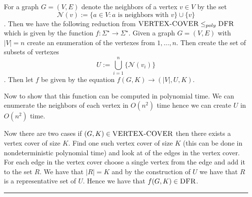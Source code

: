 \documentclass[11pt,twoside]{article}
\newcounter{problem}
\newcommand{\problembreak}{\bigskip\hrule\bigskip}
\begin{document}
For a graph $G=(V,E)$ denote the neighbors of a vertex $v\in V$ by the set $$\mathcal N(v):=\{a\in V: a\text{ is neighbors with }v\}\cup \{v\}$$. Then we have the following reduction from ${\normalfont{\textsc{VERTEX-COVER}}}\leq_{poly}{\normalfont{\textsc{DFR}}}$ which is given by the function $f:\Sigma^{\star}\to \Sigma^\star$. Given a graph $G=(V,E)$ with $|V|=n$ create an enumeration of the vertexes from $1,...,n$.  Then create the set of subsets of vertexes $$U:=\bigcup_{i=1}^n\{\mathcal{N}(v_i)\}$$. Then let $f$ be given by the equation $f(G,K)\to (|V|,U,K)$. 

Now to show that this function can be computed in polynomial time. We can enumerate the neighbors of each vertex in $O(n^2)$ time hence we can create $U$ in $O(n^2)$ time. 

Now there are two cases if $(G,K)\in{\normalfont{\textsc{VERTEX-COVER}}} $ then there exists a vertex cover of size $K$. Find one such vertex cover of size $K$ (this can be done in nondeterministic polynomial time) and look at of the edges in the vertex cover. For each edge in the vertex cover choose a single vertex from the edge and add it to the set $R$. We have that $|R|=K$ and by the construction of $U$ we have that $R$ is a representative set of $U$. Hence we have that $f(G,K)\in{\normalfont{\textsc{DFR}}}$.

\problembreak
\end{document}
